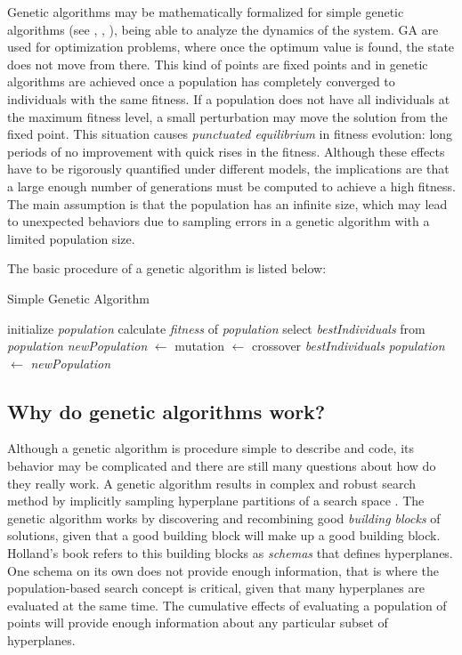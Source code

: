     \newpage
    
    Genetic algorithms may be mathematically formalized for simple genetic algorithms (see \cite{goldberg2006genetic}, \cite{vose1991punctuated}, \cite{whitley1993executable}), being able to analyze the dynamics of the system. GA are used for optimization problems, where once the optimum value is found, the state does not move from there. This kind of points are fixed points and in genetic algorithms are achieved once a population has completely converged to individuals with the same fitness. If a population does not have all individuals at the maximum fitness level, a small perturbation may move the solution from the fixed point. This situation causes \textit{punctuated equilibrium} in fitness evolution: long periods of no improvement with quick rises in the fitness. Although these effects have to be rigorously quantified under different models, the implications are that a large enough number of generations must be computed to achieve a high fitness. The main assumption is that the population has an infinite size, which may lead to unexpected behaviors due to sampling errors in a genetic algorithm with a limited population size. 
    
    The basic procedure of a genetic algorithm is listed below:
    \begin{algorithm}
        \caption{Simple Genetic Algorithm}\label{alg:simpleGApseudoCode}
        \begin{algorithmic}[1]
        \State initialize \textit{population}
            \State calculate \textit{fitness} of \textit{population}
            \State select \textit{bestIndividuals} from \textit{population}
            \State \textit{newPopulation} $\leftarrow$ mutation $\leftarrow$ crossover \textit{bestIndividuals}
            \State \textit{population} $\leftarrow$ \textit{newPopulation}
        \EndWhile
        \end{algorithmic}
    \end{algorithm}

\subsection{Why do genetic algorithms work?}

    Although a genetic algorithm is procedure simple to describe and code, its behavior may be complicated and there are still many questions about how do they really work. A genetic algorithm results in complex and robust search method by implicitly sampling hyperplane partitions of a search space \cite{whitley1994genetic}.
    The genetic algorithm works by discovering and recombining good \textit{building blocks} of solutions, given that a good building block will make up a good building block.
    Holland's book \cite{john1992holland} refers to this building blocks as \textit{schemas} that defines hyperplanes. One schema on its own does not provide enough information, that is where the population-based search concept is critical, given that many hyperplanes are evaluated at the same time. The cumulative effects of evaluating a population of points will provide enough information about any particular subset of hyperplanes.

